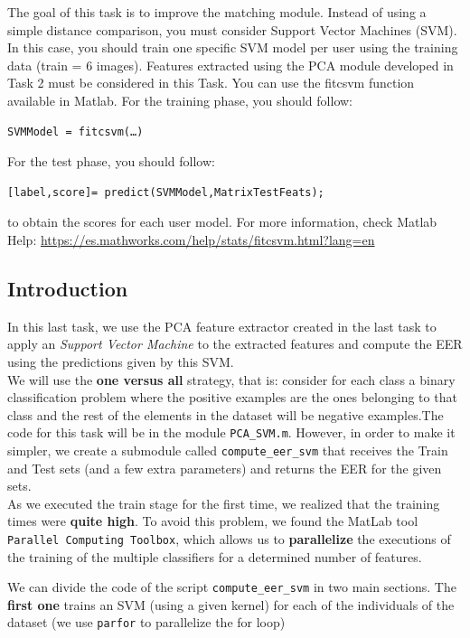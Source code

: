 \documentclass[a4paper]{article}
\def\inline{\lstinline[basicstyle=\ttfamily,keywordstyle={}]}
\begin{document}
The goal of this task is to improve the matching module. Instead of using a simple distance comparison, you must consider Support Vector Machines (SVM). In this case, you should train one specific SVM model per user using the training data (train = 6 images).
Features extracted using the PCA module developed in Task 2 must be considered in this Task. 
You can use the fitcsvm function available in Matlab. For the training phase, you should follow:
\begin{verbatim}
SVMModel = fitcsvm(…)
\end{verbatim}
For the test phase, you should follow:
\begin{verbatim}
[label,score]= predict(SVMModel,MatrixTestFeats);
\end{verbatim}
to obtain the scores for each user model. 
For more information, check Matlab Help:
\url{https://es.mathworks.com/help/stats/fitcsvm.html?lang=en} 

\subsection{Introduction}

In this last task, we use the PCA feature extractor created in the last task to apply an \emph{Support Vector Machine} to the extracted features and compute the EER using the predictions given by this SVM.\\

We will use the \textbf{one versus all} strategy, that is: consider for each class a binary classification problem where the positive examples are the ones belonging to that class and the rest of the elements in the dataset will be negative examples.The code for this task will be in the module \inline{PCA_SVM.m}. However, in order to make it simpler, we create a submodule called \inline{compute_eer_svm} that receives the Train and Test sets (and a few extra parameters) and returns the EER for the given sets.\\

As we executed the train stage for the first time, we realized that the training times were \textbf{quite high}. To avoid this problem, we found the MatLab tool \inline{Parallel Computing Toolbox}, which allows us to \textbf{parallelize} the executions of the training of the multiple classifiers for a determined number of features. 

We can divide the code of the script \inline{compute_eer_svm} in two main sections. The \textbf{first one} trains an SVM (using a given kernel) for each of the individuals of the dataset (we use \inline{parfor} to parallelize the for loop)
\end{document}
